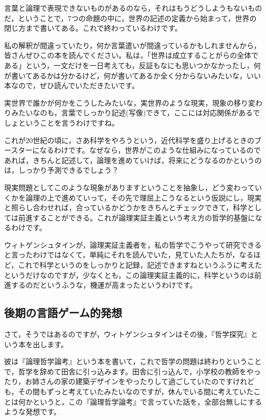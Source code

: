 \documentclass{ltjsbook}
\begin{document}
言葉と論理で表現できないものがあるのなら，それはもうどうしようもないものだ，ということで，7つの命題の中に，世界の記述の定義から始まって，世界の閉じ方まで書いてある。これで終わっているわけです。

私の解釈が間違っていたり，何か言葉遣いが間違っているかもしれませんから，皆さんぜひこの本を読んでください。私は，「世界は成立することがらの全体である」という，一文だけを一日考えても，反証もなにも思いつかなかったし，何が書いてあるかは分かるけど，何が書いてあるか全く分からないみたいな，いい本なので，ぜひ読んでいただきたいです。

実世界で誰かが何かをこうしたみたいな，実世界のような現実，現象の移り変わりみたいなのも，言葉でしっかり記述(写像)できて，ここには対応関係があるでしょということを言うわけですね。

これが20世紀の頃に，さあ科学をやろうという，近代科学を盛り上げるときのブースターになるわけです。なぜなら，世界がこのような仕組みになっているのであれば，きちんと記述して，論理を進めていけば，将来にどうなるのかというのは，しっかり予測できるでしょう？

現実問題としてこのような現象がありますということを抽象し，どう変わっていくかを論理の上で進めていって，その先で理屈上こうなるという仮説にし，現実と照らし合わせれば，合っているかどうかをきちんとチェックできて，科学としては前進することができる。これが論理実証主義という考え方の哲学的基盤になるわけです。

ウィトゲンシュタインが，論理実証主義者を，私の哲学でこうやって研究できると言ったわけではなくて，単純にそれを読んでいた，見ていた人たちが，なるほど，これで科学というのをしっかりと記録，記述できますねというふうに考えたというだけなのですが，少なくとも，この論理実証主義的に，科学というのは前進するのだというふうな，機運が高まったというわけです。

\subsection{後期の言語ゲーム的発想}
さて，そうではあるのですが，ウィトゲンシュタインはその後，『哲学探究』という本を出します。

彼は『論理哲学論考』という本を書いて，これで哲学の問題は終わりということで，哲学を辞めて田舎に引っ込みます。田舎に引っ込んで，小学校の教師をやったり，お姉さんの家の建築デザインをやったりして過ごしていたのですけれども，その間もずっと考えていたみたいなのですが，休んでいる間に考えていたことは何かというと，この『論理哲学論考』で言っていた話を，全部台無しにするような発想です。
\end{document}
